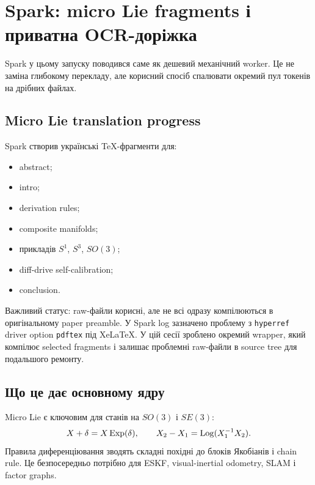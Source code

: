 \chapter{Spark: micro Lie fragments і приватна OCR-доріжка}
\label{chap:spark-session07}


Spark у цьому запуску поводився саме як дешевий механічний worker. Це не заміна глибокому перекладу, але корисний спосіб спалювати окремий пул токенів на дрібних файлах.

\section{Micro Lie translation progress}

Spark створив українські TeX-фрагменти для:
\begin{itemize}[leftmargin=*]
\item abstract;
\item intro;
\item derivation rules;
\item composite manifolds;
\item прикладів $S^1$, $S^3$, $SO(3)$;
\item diff-drive self-calibration;
\item conclusion.
\end{itemize}

Важливий статус: raw-файли корисні, але не всі одразу компілюються в оригінальному paper preamble. У Spark log зазначено проблему з \texttt{hyperref} driver option \texttt{pdftex} під XeLaTeX. У цій сесії зроблено окремий wrapper, який компілює selected fragments і залишає проблемні raw-файли в source tree для подальшого ремонту.

\section{Що це дає основному ядру}

Micro Lie є ключовим для станів на $SO(3)$ і $SE(3)$:
\begin{equation}
  X+\delta = X\operatorname{Exp}(\delta),\qquad X_2- X_1=\operatorname{Log}(X_1^{-1}X_2).
\end{equation}
Правила диференціювання зводять складні похідні до блоків Якобіанів і chain rule. Це безпосередньо потрібно для ESKF, visual-inertial odometry, SLAM і factor graphs.

